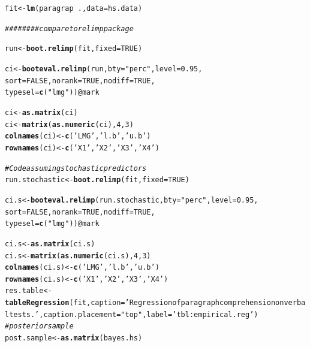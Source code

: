 \documentclass[11pt,a4paper,twoside]{book}\usepackage[]{graphicx}\usepackage[]{color}
\makeatletter
\newcommand{\hlnum}[1]{\textcolor[rgb]{0.686,0.059,0.569}{#1}}%
\newcommand{\hlstr}[1]{\textcolor[rgb]{0.192,0.494,0.8}{#1}}%
\newcommand{\hlcom}[1]{\textcolor[rgb]{0.678,0.584,0.686}{\textit{#1}}}%
\newcommand{\hlopt}[1]{\textcolor[rgb]{0,0,0}{#1}}%
\newcommand{\hlstd}[1]{\textcolor[rgb]{0.345,0.345,0.345}{#1}}%
\newcommand{\hlkwb}[1]{\textcolor[rgb]{0.69,0.353,0.396}{#1}}%
\newcommand{\hlkwc}[1]{\textcolor[rgb]{0.333,0.667,0.333}{#1}}%
\newcommand{\hlkwd}[1]{\textcolor[rgb]{0.737,0.353,0.396}{\textbf{#1}}}%
\newenvironment{kframe}{%
 \def\at@end@of@kframe{}%
 \ifinner\ifhmode%
  \def\at@end@of@kframe{\end{minipage}}%
  \begin{minipage}{\columnwidth}%
 \fi\fi%
 \def\FrameCommand##1{\hskip\@totalleftmargin \hskip-\fboxsep
 \colorbox{shadecolor}{##1}\hskip-\fboxsep
     \hskip-\linewidth \hskip-\@totalleftmargin \hskip\columnwidth}%
 \MakeFramed {\advance\hsize-\width
   \@totalleftmargin\z@ \linewidth\hsize
   \@setminipage}}%
 {\par\unskip\endMakeFramed%
 \at@end@of@kframe}
\newenvironment{knitrout}{}{} %
\makeatother
\begin{document}
\begin{knitrout}
\begin{kframe}
\begin{alltt}
\hlstd{fit} \hlkwb{<-} \hlkwd{lm}\hlstd{(paragrap}\hlopt{~}\hlstd{.,} \hlkwc{data}\hlstd{= hs.data)}


\hlcom{######## compare to relimp package}

\hlstd{run}\hlkwb{<-}\hlkwd{boot.relimp}\hlstd{(fit,} \hlkwc{fixed}\hlstd{=}\hlnum{TRUE}\hlstd{)}

\hlstd{ci} \hlkwb{<-} \hlkwd{booteval.relimp}\hlstd{(run,} \hlkwc{bty} \hlstd{=} \hlstr{"perc"}\hlstd{,} \hlkwc{level} \hlstd{=} \hlnum{0.95}\hlstd{,}
                \hlkwc{sort} \hlstd{=} \hlnum{FALSE}\hlstd{,} \hlkwc{norank} \hlstd{=} \hlnum{TRUE}\hlstd{,} \hlkwc{nodiff} \hlstd{=} \hlnum{TRUE}\hlstd{,}
                \hlkwc{typesel} \hlstd{=} \hlkwd{c}\hlstd{(}\hlstr{"lmg"}\hlstd{))}\hlopt{@}\hlkwc{mark}

\hlstd{ci} \hlkwb{<-} \hlkwd{as.matrix}\hlstd{(ci)}
\hlstd{ci} \hlkwb{<-} \hlkwd{matrix}\hlstd{(}\hlkwd{as.numeric}\hlstd{(ci),} \hlnum{4} \hlstd{,} \hlnum{3}\hlstd{)}
\hlkwd{colnames}\hlstd{(ci)} \hlkwb{<-} \hlkwd{c}\hlstd{(}\hlstr{'LMG'}\hlstd{,} \hlstr{'l.b'}\hlstd{,} \hlstr{'u.b'}\hlstd{)}
\hlkwd{rownames}\hlstd{(ci)} \hlkwb{<-} \hlkwd{c}\hlstd{(}\hlstr{'X1'}\hlstd{,} \hlstr{'X2'}\hlstd{,} \hlstr{'X3'}\hlstd{,} \hlstr{'X4'}\hlstd{)}

\hlcom{#Code assuming stochastic predictors}
\hlstd{run.stochastic}\hlkwb{<-}\hlkwd{boot.relimp}\hlstd{(fit,} \hlkwc{fixed}\hlstd{=}\hlnum{TRUE}\hlstd{)}

\hlstd{ci.s} \hlkwb{<-} \hlkwd{booteval.relimp}\hlstd{(run.stochastic,} \hlkwc{bty} \hlstd{=} \hlstr{"perc"}\hlstd{,} \hlkwc{level} \hlstd{=} \hlnum{0.95}\hlstd{,}
                \hlkwc{sort} \hlstd{=} \hlnum{FALSE}\hlstd{,} \hlkwc{norank} \hlstd{=} \hlnum{TRUE}\hlstd{,} \hlkwc{nodiff} \hlstd{=} \hlnum{TRUE}\hlstd{,}
                \hlkwc{typesel} \hlstd{=} \hlkwd{c}\hlstd{(}\hlstr{"lmg"}\hlstd{))}\hlopt{@}\hlkwc{mark}

\hlstd{ci.s} \hlkwb{<-} \hlkwd{as.matrix}\hlstd{(ci.s)}
\hlstd{ci.s} \hlkwb{<-} \hlkwd{matrix}\hlstd{(}\hlkwd{as.numeric}\hlstd{(ci.s),} \hlnum{4} \hlstd{,} \hlnum{3}\hlstd{)}
\hlkwd{colnames}\hlstd{(ci.s)} \hlkwb{<-} \hlkwd{c}\hlstd{(}\hlstr{'LMG'}\hlstd{,} \hlstr{'l.b'}\hlstd{,} \hlstr{'u.b'}\hlstd{)}
\hlkwd{rownames}\hlstd{(ci.s)} \hlkwb{<-} \hlkwd{c}\hlstd{(}\hlstr{'X1'}\hlstd{,} \hlstr{'X2'}\hlstd{,} \hlstr{'X3'}\hlstd{,} \hlstr{'X4'}\hlstd{)}
\hlstd{res.table} \hlkwb{<-} \hlkwd{tableRegression}\hlstd{(fit,} \hlkwc{caption}\hlstd{=}\hlstr{'Regression of paragraph comprehension on verbal tests.'}\hlstd{,} \hlkwc{caption.placement} \hlstd{=} \hlstr{"top"}\hlstd{,} \hlkwc{label} \hlstd{=} \hlstr{'tbl:empirical.reg'}\hlstd{)}
\hlcom{#posterior sample}
\hlstd{post.sample} \hlkwb{<-} \hlkwd{as.matrix}\hlstd{(bayes.hs)}


\end{alltt}
\end{kframe}
\end{knitrout}
\end{document}
